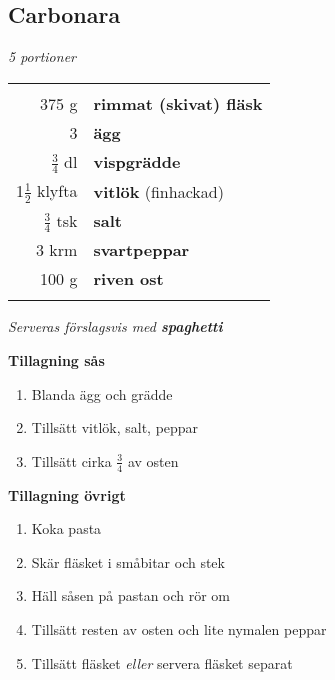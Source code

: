 \documentclass[a4paper,12pt]{article}
\newcommand{\port}[1]{\noindent \textit{#1 portioner}}
\newcommand{\tillb}[1]{\noindent \textit{Serveras förslagsvis med \textbf{#1}} \vspace{1cm}}
\begin{document}
\clearpage

\subsection{Carbonara}
\port{5}

\begin{table}[H]
	\begin{tabular}{rl}
	\hline
	&\\
		375 g & \textbf{rimmat (skivat) fläsk}\\
		3 & \textbf{ägg}\\
		$\frac{3}{4}$ dl & \textbf{vispgrädde}\\
		1$\frac{1}{2}$ klyfta & \textbf{vitlök} (finhackad)\\
		$\frac{3}{4}$ tsk & \textbf{salt}\\
		3 krm & \textbf{svartpeppar}\\
		100 g & \textbf{riven ost}\\
	&\\
	\hline
	\end{tabular}
\end{table}

\tillb{spaghetti}

\begin{multicols*}{2}

\noindent \textbf{Tillagning sås}
\begin{enumerate}
	\itemsep0cm
	\item Blanda ägg och grädde
	\item Tillsätt vitlök, salt, peppar
	\item Tillsätt cirka $\frac{3}{4}$ av osten
\end{enumerate}

\noindent \textbf{Tillagning övrigt}
\begin{enumerate}
	\itemsep0cm
	\item Koka pasta
	\item Skär fläsket i småbitar och stek
	\item Häll såsen på pastan och rör om
	\item Tillsätt resten av osten och lite nymalen peppar
	\item Tillsätt fläsket \textit{eller} servera fläsket separat
\end{enumerate}

\end{multicols*}

\clearpage
\end{document}
